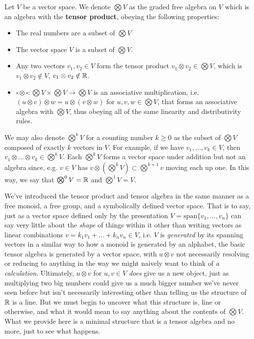 \documentclass[11pt]{article}
\begin{document}
\begin{definition}
Let $V$ be a vector space. We denote $\bigotimes V$ as the graded free algebra on $V$ which is an algebra with the \textbf{tensor product}, obeying the following properties: \begin{itemize}
\item The real numbers are a subset of $\bigotimes V$
\item The vector space $V$ is a subset of $\bigotimes V$.
\item Any two vectors $v_1, v_2 \in V$ form the tensor product $v_1 \otimes v_2 \in \bigotimes V$, which is $v_1 \otimes v_2 \notin V$, $v_1 \otimes v_2 \notin \mathbb{R}$.
\item $\square \otimes \square \colon \bigotimes V \times \bigotimes V \to \bigotimes V$ is an associative multiplication, i.e. $(u \otimes v) \otimes w = u \otimes (v \otimes w)$ for $u,v,w \in \bigotimes V$, that forms an associative algebra with $\bigotimes V$, thus obeying all of the same linearity and distributivity rules.
\end{itemize}

We may also denote $\bigotimes^k V$ for a counting number $k \ge 0$ as the subset of $\bigotimes V$ composed of exactly $k$ vectors in $V$. For example, if we have $v_1, \dots, v_k \in V$, then $v_1 \otimes \dots \otimes v_k \in \bigotimes^k V$. Each $\bigotimes^k V$ forms a vector space under addition but not an algebra since, e.g. $v \in V$ has $v \otimes (\bigotimes^k V) \subset \bigotimes^{k+1} v$ moving each  up one. In this way, we say that $\bigotimes^0 V = \mathbb{R}$ and $\bigotimes^1 V = V$.
\end{definition}

We've introduced the tensor product and tensor algebra in the same manner as a free monoid, a free group, and a symbolically defined vector space. That is to say, just as a vector space defined only by the presentation $V = \mathrm{span}\{ v_1, \dots, v_n \}$ can say very little about the \emph{shape} of things within it other than writing vectors as linear combinations $v = k_1 v_1 + \dots + k_n v_n \in V$, i.e. $V$ is \emph{generated} by its spanning vectors in a similar way to how a monoid is generated by an alphabet, the basic tensor algebra is generated by a vector space, with $u \otimes v$ not necessarily resolving or reducing to anything in the way we might naively want to think of \emph{a calculation}. Ultimately, $u \otimes v$ for $u,v \in V$ \emph{does} give us a new object, just as multiplying two big numbers could give us a much bigger number we've never seen before but isn't necessarily interesting other than telling us the structure of $\mathbb{R}$ is a line. But we must begin to uncover what this structure is, line or otherwise, and what it would mean to say anything about the contents of $\bigotimes V$. What we provide here is a minimal structure that is a tensor algebra and no more, just to see what happens.
\end{document}
